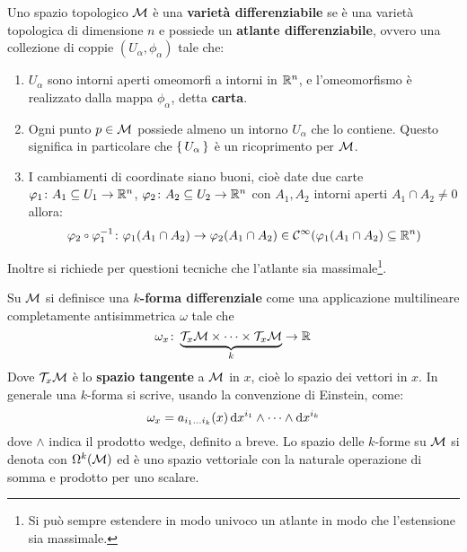 \begin{definition}
  Uno spazio topologico $ \mathcal{M} $ è una \textbf{varietà differenziabile}
  se è una varietà topologica di dimensione $ n $ e possiede un \textbf{atlante differenziabile},
  ovvero una collezione di coppie $ (U_\alpha, \phi_\alpha) $ tale che:
  \begin{enumerate}
  \item $ U_\alpha $ sono intorni aperti omeomorfi a intorni in $ \mathbb{R}^{n} $, e l'omeomorfismo
    è realizzato dalla mappa $ \phi_\alpha $, detta \textbf{carta}.
  \item Ogni punto $ p \in \mathcal{M} $ possiede almeno un intorno $ U_\alpha $ che lo
    contiene. Questo significa in particolare che $ \set{U_\alpha} $ è un
    ricoprimento per $ \mathcal{M} $.
  \item I cambiamenti di coordinate siano buoni, cioè date due carte
    $ \varphi_1\colon A_1 \subseteq U_1 \to \mathbb{R}^{n} $, $ \varphi_2 \colon A_2 \subseteq U_2 \to \mathbb{R}^{n} $ con
    $ A_1, A_2 $ intorni aperti $ A_1 \cap A_2 \not = 0 $ allora:
    \[
      \phi_2 \circ \phi_1^{-1} \colon \phi_1(A_1 \cap A_2) \to \phi_2(A_1 \cap A_2) \in \mathcal{C}^\infty(\phi_1(A_1 \cap A_2) \subseteq \RN{n})
    \]
  \end{enumerate}
  Inoltre si richiede per questioni tecniche che l'atlante sia massimale\footnote{Si può sempre
    estendere in modo univoco un atlante in modo che l'estensione sia massimale.}.
\end{definition}
\begin{definition}
  Su $ \mathcal{M} $ si definisce una \textbf{$ k $-forma differenziale} come
  una applicazione multilineare completamente antisimmetrica $ \omega $ tale che
  \[
    \omega_x \colon \underbrace{\mathcal{T}_x\mathcal{M} \times \dots \times \mathcal{T}_x\mathcal{M}}_{k} \to \mathbb{R}^{}
  \]
  Dove $ \mathcal{T}_x\mathcal{M} $ è lo \textbf{spazio tangente} a $ \mathcal{M} $ in $ x $, cioè lo spazio
  dei vettori in $ x $.
  In generale una $ k $-forma si scrive, usando la convenzione di Einstein, come:
  \[
    \omega_x = a_{i_1\dots i_k}(x) \operatorname{d}\!{x}^{i_1} \wedge \dots \wedge \operatorname{d}\!{x}^{i_k}
  \]
  dove $ \wedge $ indica il prodotto wedge, definito a breve. Lo spazio delle
  $ k $-forme su $ \mathcal{M} $ si denota con $ \Omega^k(\mathcal{M}) $ ed è uno spazio vettoriale
  con la naturale operazione di somma e prodotto per uno scalare.
\end{definition}
